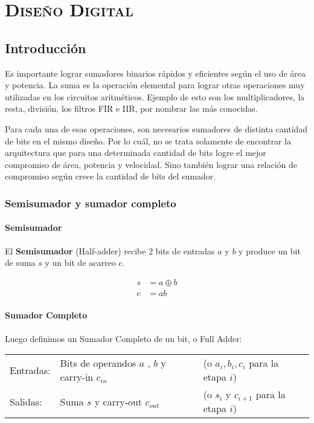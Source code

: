 



\chapter{ \textsc{ Diseño Digital } }\label{diseñoDigital}

\section{Introducción}
Es importante lograr sumadores binarios rápidos y eficientes según el uso de área y potencia. La suma es la operación elemental para lograr otras operaciones muy utilizadas en los circuitos aritméticos. Ejemplo de esto son los multiplicadores, la resta, división, los filtros FIR e IIR, por nombrar las más conocidas.


Para cada una de esas operaciones, son necesarios sumadores de distinta cantidad de bits en el mismo diseño. Por lo cuál, no se trata solamente de encontrar la arquitectura que para una determinada cantidad de bits logre el mejor compromiso de área, potencia y velocidad. Sino también lograr una relación de compromiso según crece la cantidad de bits del sumador. 

\subsection{Semisumador y sumador completo}
\subsubsection{Semisumador}
El {\bf Semisumador} (Half-adder) recibe 2 bits de entradas \(a\) y \(b\) y produce un bit de suma \(s\) y un bit de acarreo \(c\).

\begin{subequations}
\begin{align}
s &= a \oplus b\\
c &= ab
\end{align}
\end{subequations}

\subsubsection{Sumador Completo}
Luego definimos un Sumador Completo de un bit, o Full Adder:
\begin{center}
\begin{tabular}{lll}
Entradas: & Bits de operandos \(a\) , \(b\) y carry-in \(c_{in}\) & (o \(a_i, b_i, c_i\) para la etapa \(i\)) \\
Salidas: & Suma \(s\) y carry-out \(c_{out}\) & (o \(s_i\) y \(c_{i+1}\) para la etapa \(i\)) \\
\end{tabular}
\end{center}

